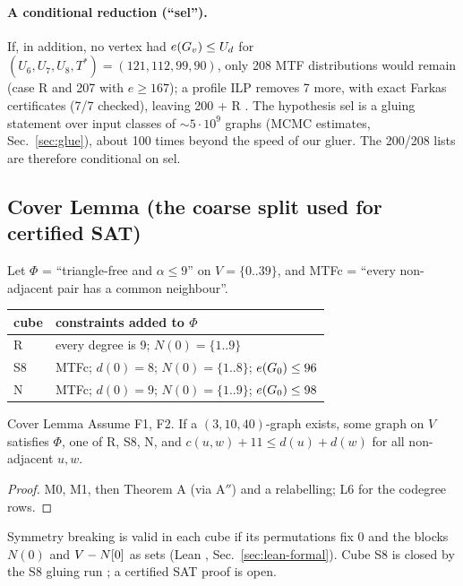 \paragraph{A conditional reduction (``sel'').} If, in addition, no vertex had $e(G_{v}) \le U_d$ for
$(U_6, U_7, U_8, T^*) = (121, 112, 99, 90)$, only 208 MTF distributions would remain (case R and 207 with $e \ge 167$);
a profile ILP removes 7 more, with exact Farkas certificates (7/7 checked), leaving 200 + R
. The hypothesis sel is a gluing statement over input classes of
${\sim}5\cdot 10^{9}$ graphs (MCMC estimates, Sec.~\ref{sec:glue}), about 100 times beyond the speed of our gluer. The 200/208 lists are
therefore conditional on sel.

\subsection{Cover Lemma (the coarse split used for certified SAT)}\label{sec:cover}
Let $\Phi$ = ``triangle-free and $\alpha \le 9$'' on $V = \{0..39\}$, and MTFc = ``every non-adjacent pair has a common neighbour''.

\begin{center}\small
\begin{tabular}{@{}ll@{}}
\toprule
cube & constraints added to $\Phi$ \\
\midrule
R & every degree is 9; $N(0) = \{1..9\}$ \\
S8 & MTFc; $d(0) = 8$; $N(0) = \{1..8\}$; $e(G_{0}) \le 96$ \\
N & MTFc; $d(0) = 9$; $N(0) = \{1..9\}$; $e(G_{0}) \le 98$ \\
\bottomrule
\end{tabular}
\end{center}

\begin{namedthm}{Cover Lemma}
Assume F1, F2. If a $(3,10,40)$-graph exists, some graph on $V$ satisfies $\Phi$, one of R, S8, N,
and $c(u,w) + 11 \le d(u) + d(w)$ for all non-adjacent $u, w$.
\end{namedthm}
\begin{proof}
M0, M1, then Theorem A (via A$''$) and a relabelling; L6 for the codegree rows.
\end{proof}
Symmetry breaking is valid in each cube if its permutations fix 0 and the blocks $N(0)$ and $V - N[0]$ as sets
(Lean , Sec.~\ref{sec:lean-formal}). Cube S8 is closed by the S8 gluing run ; a certified SAT proof is
open.


